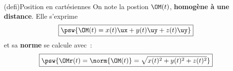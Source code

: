 \documentclass[../../main/main.tex]{subfiles}
\begin{document}
\begin{tcb}[sidebyside, righthand ratio=.25](defi){Position en cartésiennes}
	On note la postion $\OM(t)$, \textbf{homogène à une distance}. Elle s'exprime
	\[\boxed{\psw{\OM(t) = x(t)\ux + y(t)\uy + z(t)\uy}}\]
	et sa \textbf{norme} se calcule avec~:
	\[\boxed{\psw{\OMr(t) = \norm{\OM(t)} = \sqrt{x(t)^2 + y(t)^2 + z(t)^2}}}\]
	\tcblower
	\begin{center}
		\vspace{-15pt}
		\captionsetup{justification=centering}
	\end{center}
\end{tcb}
\end{document}
